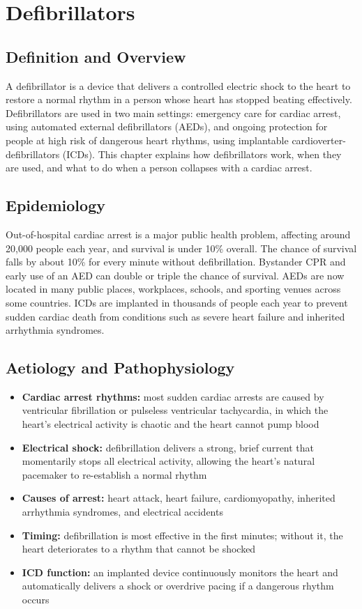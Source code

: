 \chapter{Defibrillators}

\section*{Definition and Overview}
A defibrillator is a device that delivers a controlled electric shock to the heart to restore a normal rhythm in a person whose heart has stopped beating effectively. Defibrillators are used in two main settings: emergency care for cardiac arrest, using automated external defibrillators (AEDs), and ongoing protection for people at high risk of dangerous heart rhythms, using implantable cardioverter-defibrillators (ICDs). This chapter explains how defibrillators work, when they are used, and what to do when a person collapses with a cardiac arrest.

\section*{Epidemiology}
Out-of-hospital cardiac arrest is a major public health problem, affecting around 20,000 people each year, and survival is under 10\% overall. The chance of survival falls by about 10\% for every minute without defibrillation. Bystander CPR and early use of an AED can double or triple the chance of survival. AEDs are now located in many public places, workplaces, schools, and sporting venues across some countries. ICDs are implanted in thousands of people each year to prevent sudden cardiac death from conditions such as severe heart failure and inherited arrhythmia syndromes.

\section*{Aetiology and Pathophysiology}
\begin{itemize}
    \item \textbf{Cardiac arrest rhythms:} most sudden cardiac arrests are caused by ventricular fibrillation or pulseless ventricular tachycardia, in which the heart's electrical activity is chaotic and the heart cannot pump blood
    \item \textbf{Electrical shock:} defibrillation delivers a strong, brief current that momentarily stops all electrical activity, allowing the heart's natural pacemaker to re-establish a normal rhythm
    \item \textbf{Causes of arrest:} heart attack, heart failure, cardiomyopathy, inherited arrhythmia syndromes, and electrical accidents
    \item \textbf{Timing:} defibrillation is most effective in the first minutes; without it, the heart deteriorates to a rhythm that cannot be shocked
    \item \textbf{ICD function:} an implanted device continuously monitors the heart and automatically delivers a shock or overdrive pacing if a dangerous rhythm occurs
\end{itemize}

